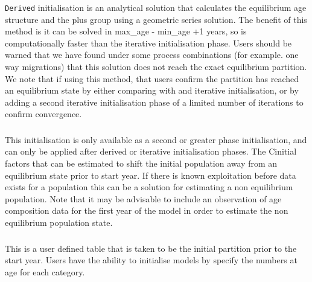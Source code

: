 \subsubsection*{}

\texttt{Derived} initialisation is an analytical solution that calculates the equilibrium age structure and the plus group using a geometric series solution. The benefit of this method is it can be solved in max\_age - min\_age +1 years, so is computationally faster than the iterative initialisation phase. Users should be warned that we have found under some process combinations (for example. one way migrations) that this solution does not reach the exact equilibrium partition. We note that if using this method, that users confirm the partition has reached an equilibrium state by either comparing with and iterative initialisation, or by adding a second iterative initialisation phase of a limited number of iterations to confirm convergence.

\subsubsection*{}

This initialisation is only available as a second or greater phase initialisation, and can only be applied after derived or iterative initialisation phases. The Cinitial factors that can be estimated to shift the initial population away from an equilibrium state prior to start year. If there is known exploitation before data exists for a population this can be a solution for estimating a non equilibrium population. Note that it may be advisable to include an observation of age composition data for the first year of the model in order to estimate the non equilibrium population state. 

\subsubsection*{}

This is a user defined table that is taken to be the initial partition prior to the start year. Users have the ability to initialise models by specify the numbers at age for each category. 

\subsection{}

